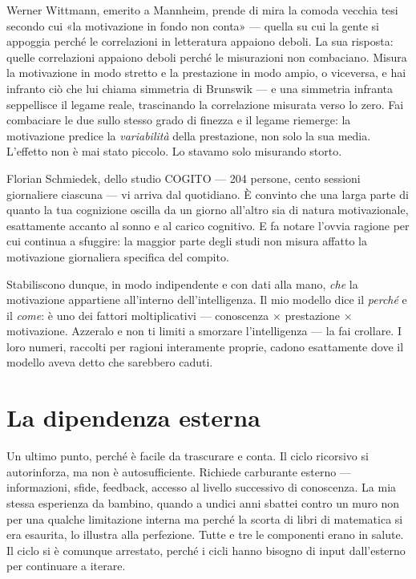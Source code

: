 \documentclass[11pt, twoside, openright]{book}
\begin{document}
Werner Wittmann, emerito a Mannheim, prende di mira la comoda vecchia tesi secondo cui «la motivazione in fondo non conta» --- quella su cui la gente si appoggia perché le correlazioni in letteratura appaiono deboli. La sua risposta: quelle correlazioni appaiono deboli perché le misurazioni non combaciano. Misura la motivazione in modo stretto e la prestazione in modo ampio, o viceversa, e hai infranto ciò che lui chiama simmetria di Brunswik --- e una simmetria infranta seppellisce il legame reale, trascinando la correlazione misurata verso lo zero. Fai combaciare le due sullo stesso grado di finezza e il legame riemerge: la motivazione predice la \textit{variabilità} della prestazione, non solo la sua media. L'effetto non è mai stato piccolo. Lo stavamo solo misurando storto.

Florian Schmiedek, dello studio COGITO --- 204 persone, cento sessioni giornaliere ciascuna --- vi arriva dal quotidiano. È convinto che una larga parte di quanto la tua cognizione oscilla da un giorno all'altro sia di natura motivazionale, esattamente accanto al sonno e al carico cognitivo. E fa notare l'ovvia ragione per cui continua a sfuggire: la maggior parte degli studi non misura affatto la motivazione giornaliera specifica del compito.

Stabiliscono dunque, in modo indipendente e con dati alla mano, \textit{che} la motivazione appartiene all'interno dell'intelligenza. Il mio modello dice il \textit{perché} e il \textit{come}: è uno dei fattori moltiplicativi --- conoscenza × prestazione × motivazione. Azzeralo e non ti limiti a smorzare l'intelligenza --- la fai crollare. I loro numeri, raccolti per ragioni interamente proprie, cadono esattamente dove il modello aveva detto che sarebbero caduti.

\section*{La dipendenza esterna}

Un ultimo punto, perché è facile da trascurare e conta. Il ciclo ricorsivo si autorinforza, ma non è autosufficiente. Richiede carburante esterno --- informazioni, sfide, feedback, accesso al livello successivo di conoscenza. La mia stessa esperienza da bambino, quando a undici anni sbattei contro un muro non per una qualche limitazione interna ma perché la scorta di libri di matematica si era esaurita, lo illustra alla perfezione. Tutte e tre le componenti erano in salute. Il ciclo si è comunque arrestato, perché i cicli hanno bisogno di input dall'esterno per continuare a iterare.
\end{document}
